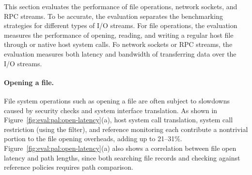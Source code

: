 \label{sec:eval:pal:stream}

This section
evaluates the performance of
file operations, network sockets, and RPC streams.
To be accurate,
the evaluation separates the benchmarking strategies
for different types of I/O streams.
For file operations,
the evaluation
measures the performance of opening, reading, and writing a regular host file through \hostapis{} or native host system calls.
Fo network sockets or RPC streams,
the evaluation measures 
both latency and bandwidth of transferring data over the I/O streams.







\paragraph{Opening a file.}
File system operations such as opening a file
are often subject to
slowdowns caused by security checks and system interface translation.
As shown in Figure~\ref{fig:eval:pal:open-latency}(a),
host system call translation, system call restriction (using the \seccomp{} filter), and reference monitoring
each contribute a nontrivial portion to the file opening overheads,
adding up to 21--31\%.
Figure~\ref{fig:eval:pal:open-latency}(a)
also shows a correlation
between file open latency and path lengths,
since both searching file records and checking against reference policies
requires path comparison.



